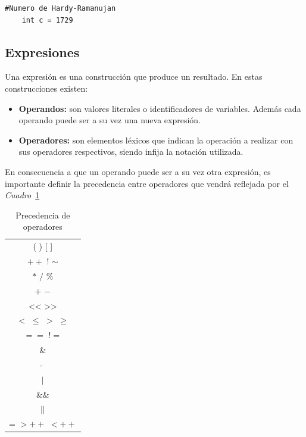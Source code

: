 \documentclass[a4paper,10pt]{article}
\begin{document}
\begin{lstlisting}[language=jam]
	#Numero de Hardy-Ramanujan
	int c = 1729 
\end{lstlisting}
\subsection{Expresiones}
Una expresión es una construcción que produce un resultado. En estas construcciones existen:
\begin{itemize}
\item {\bf Operandos:} son valores literales o identificadores de variables. Además cada operando puede ser a su vez una nueva expresión.

\item {\bf Operadores:} son elementos léxicos que indican la operación a realizar con sus operadores respectivos, siendo infija la notación utilizada.
\end{itemize}

En consecuencia a que un operando puede ser a su vez otra expresión, es importante definir la precedencia entre operadores que vendrá reflejada por el \emph{Cuadro}~\ref{tab:precedence}

\begin{table}[htp!]
\centering
\begin{tabular}{|c|}         
\hline
( ) [ ] \\
$++$ $!$ $\sim$\\
$*$ $/$ $\%$ \\
$+$ $-$ \\
<< >> \\
$<$ $\leq$ $>$ $\geq$\\
$==$ $!=$ \\
\& \\
$\hat{}$ \\
$|$ \\
\&\& \\
$||$ \\
= $>++$ $<++$	\\ \hline
\end{tabular}
\caption{Precedencia de operadores}
\label{tab:precedence}
\end{table}
\end{document}
